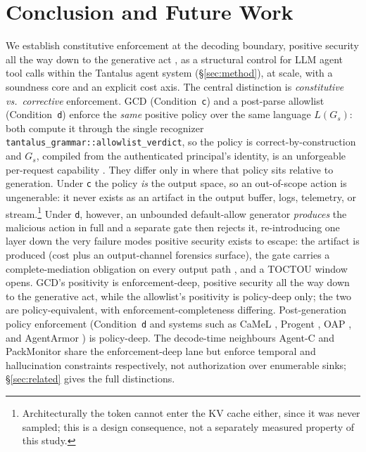 \section{Conclusion and Future Work}
\label{sec:conclusion}

We establish constitutive enforcement at the decoding boundary, positive security all the way down to the generative act \cite{saltzer1975,anderson1972}, as a structural control for LLM agent tool calls within the Tantalus agent system (\S\ref{sec:method}), at scale, with a soundness core and an explicit cost axis. The central distinction is \emph{constitutive vs.\ corrective} enforcement. GCD (Condition~\texttt{c}) and a post-parse allowlist (Condition~\texttt{d}) enforce the \emph{same} positive policy over the same language \(L(G_s)\): both compute it through the single recognizer \texttt{tantalus\_grammar::allowlist\_verdict}, so the policy is correct-by-construction \cite{sassaman2013langsec} and \(G_s\), compiled from the authenticated principal's identity, is an unforgeable per-request capability \cite{dennisvanhorn1966,miller2006}. They differ only in where that policy sits relative to generation. Under \texttt{c} the policy \emph{is} the output space, so an out-of-scope action is ungenerable: it never exists as an artifact in the output buffer, logs, telemetry, or stream.\footnote{Architecturally the token cannot enter the KV cache either, since it was never sampled; this is a design consequence, not a separately measured property of this study.} Under \texttt{d}, however, an unbounded default-allow generator \emph{produces} the malicious action in full and a separate gate then rejects it, re-introducing one layer down the very failure modes positive security exists to escape: the artifact is produced (cost plus an output-channel forensics surface), the gate carries a complete-mediation obligation on every output path \cite{saltzer1975}, and a TOCTOU window opens. GCD's positivity is enforcement-deep, positive security all the way down to the generative act, while the allowlist's positivity is policy-deep only; the two are policy-equivalent, with enforcement-completeness differing. Post-generation policy enforcement (Condition~\texttt{d} and systems such as CaMeL \cite{camel2025}, Progent \cite{progent2025}, OAP \cite{oap2026}, and AgentArmor \cite{agentarmor2025}) is policy-deep. The decode-time neighbours Agent-C \cite{agentc2025} and PackMonitor \cite{packmonitor2026} share the enforcement-deep lane but enforce temporal and hallucination constraints respectively, not authorization over enumerable sinks; \S\ref{sec:related} gives the full distinctions.

